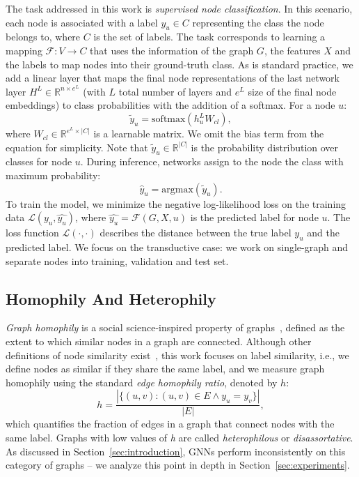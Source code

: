 \documentclass[conference]{IEEEtran}
\begin{document}
The task addressed in this work is \textit{supervised node classification}. In this scenario, each node is associated with a label \(y_u\in C\) representing the class the node belongs to, where \(C\) is the set of labels. The task corresponds to learning a mapping \(\mathcal{F}: V \rightarrow C\) that uses the information of the graph \(G\), the features \(X\) and the labels to map nodes into their ground-truth class.
As is standard practice, we add a linear layer that maps the final node representations of the last network layer $H^{L} \in \mathbb{R}^{n\times e^L}$ (with $L$ total number of layers and $e^L$ size of the final node embeddings) to class probabilities with the addition of a softmax. For a node $u$:
\begin{equation}
    \label{eq:gcnh_class}
    \tilde{y}_{u} = \text{softmax}(h_u^{L} W_{cl}),
\end{equation}
where $W_{cl} \in  \mathbb{R}^{e^L \times |C|}$ is a learnable matrix. We omit the bias term from the equation for simplicity.
Note that $\tilde{y}_{u} \in \mathbb{R}^{|C|}$ is the probability distribution over classes for node $u$.
During inference, networks assign to the node the class with maximum probability:
~\begin{equation}
     \label{eq:gcnh_assigned_class}
     \hat{y}_{u} = \text{argmax}(\tilde{y}_{u}).
 \end{equation}
To train the model, we minimize the negative log-likelihood loss on the training data
\(\mathcal{L}(y_u,\hat{y_u})\),  where \(\hat{y_u} = \mathcal{F}(G, X, u)\) is the predicted label for node \(u\).
The loss function \(\mathcal{L}(\cdot,\cdot)\) describes the distance between the true label \(y_u\) and the predicted label. We focus on the transductive case: we work on single-graph and separate nodes into training, validation and test set.

\subsection{Homophily And Heterophily}
\textit{Graph homophily} is a social science-inspired property of graphs~\cite{mcpherson_birds_2001}, defined as the extent to which similar nodes in a graph are connected. Although other definitions of node similarity exist~\cite{yang_diverse_2021, ma_is_2022, cavallo_2ncs_2022}, this work focuses on label similarity, i.e., we define nodes as similar if they share the same label, and we measure graph homophily using the standard \textit{edge homophily ratio}, denoted by $h$:
\begin{equation}
    h = \frac{|\{(u,v):(u,v)\in E \land y_u=y_v\}|}{|E|},
    \label{eq:edge_hom_rat}
\end{equation}
which quantifies the fraction of edges in a graph that connect nodes with the same label.
Graphs with low values of \textit{h} are called \textit{heterophilous} or \textit{disassortative}. As discussed in Section~\ref{sec:introduction}, GNNs perform inconsistently on this category of graphs -- we analyze this point in depth in Section~\ref{sec:experiments}.
\end{document}
